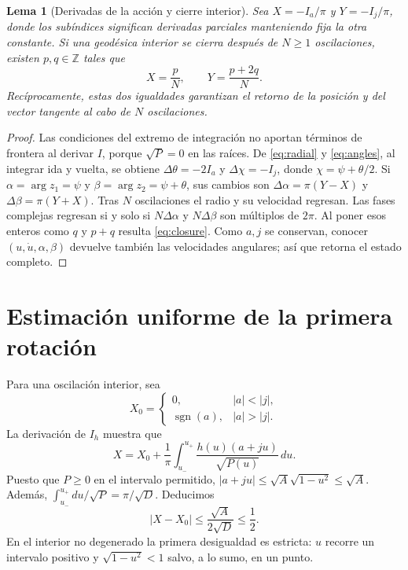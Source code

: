 \documentclass[11pt,a4paper]{article}
\newtheorem{lemma}[theorem]{Lema}
\theoremstyle{remark}\newtheorem{remark}[theorem]{Observación}
\newcommand{\Z}{\mathbb Z}
\newcommand{\sgn}{\operatorname{sgn}}
\begin{document}
\begin{lemma}[Derivadas de la acción y cierre interior]\label{lem:closure}
Sea $X=-I_a/\pi$ y $Y=-I_j/\pi$, donde los subíndices significan derivadas parciales manteniendo fija la otra constante. Si una geodésica interior se cierra después de $N\ge1$ oscilaciones, existen $p,q\in\Z$ tales que
\begin{equation}\label{eq:closure}
\boxed{X=\frac pN,\qquad Y=\frac{p+2q}{N}.}
\end{equation}
Recíprocamente, estas dos igualdades garantizan el retorno de la posición y del vector tangente al cabo de $N$ oscilaciones.
\end{lemma}
\begin{proof}
Las condiciones del extremo de integración no aportan términos de frontera al derivar $I$, porque $\sqrt P=0$ en las raíces. De \eqref{eq:radial} y \eqref{eq:angles}, al integrar ida y vuelta, se obtiene $\Delta\theta=-2I_a$ y $\Delta\chi=-I_j$, donde $\chi=\psi+\theta/2$. Si $\alpha=\arg z_1=\psi$ y $\beta=\arg z_2=\psi+\theta$, sus cambios son $\Delta\alpha=\pi(Y-X)$ y $\Delta\beta=\pi(Y+X)$. Tras $N$ oscilaciones el radio y su velocidad regresan. Las fases complejas regresan si y solo si $N\Delta\alpha$ y $N\Delta\beta$ son múltiplos de $2\pi$. Al poner esos enteros como $q$ y $p+q$ resulta \eqref{eq:closure}. Como $a,j$ se conservan, conocer $(u,\dot u,\alpha,\beta)$ devuelve también las velocidades angulares; así que retorna el estado completo.
\end{proof}

\section{Estimación uniforme de la primera rotación}
Para una oscilación interior, sea
\[
X_0=\begin{cases}0,&|a|<|j|,\\ \sgn(a),&|a|>|j|.\end{cases}
\]
La derivación de $I_h$ muestra que
\begin{equation}\label{eq:X}
X=X_0+\frac1\pi\int_{u_-}^{u_+}\frac{h(u)(a+ju)}{\sqrt{P(u)}}\,du.
\end{equation}
Puesto que $P\ge0$ en el intervalo permitido, $|a+ju|\le\sqrt A\sqrt{1-u^2}\le\sqrt A$. Además, $\int_{u_-}^{u_+}du/\sqrt P=\pi/\sqrt D$. Deducimos
\begin{equation}\label{eq:Xbound}
\boxed{|X-X_0|\le\frac{\sqrt A}{2\sqrt D}\le\frac12.}
\end{equation}
En el interior no degenerado la primera desigualdad es estricta: $u$ recorre un intervalo positivo y $\sqrt{1-u^2}<1$ salvo, a lo sumo, en un punto.
\end{document}

